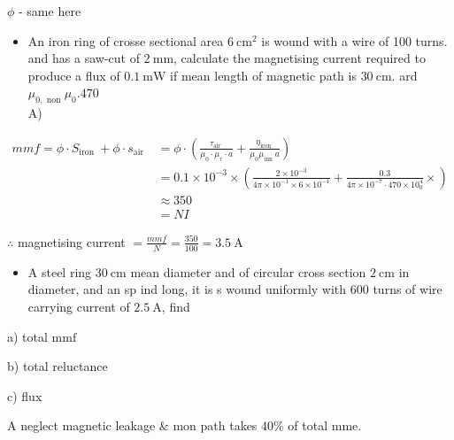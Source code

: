 \documentclass[12pt, a4paper]{article}
\begin{document}
$\phi$ - same here

\begin{itemize}
	\item An iron ring of crosse sectional area $6 \mathrm{~cm}^{2}$ is wound with a wire of 100 turns. and has a saw-cut of $2 \mathrm{~mm}$, calculate the magnetising current required to produce a flux of $0.1 \mathrm{~mW}$ if mean length of magnetic path is $30 \mathrm{~cm}$. ard $\mu_{0, \text { non }} \mu_{0} .470$\\
	      A)
\end{itemize}

$$
	\begin{aligned}
		m m f=\phi \cdot S_{\text {iron }}+\phi \cdot s_{\text {air }} & =\phi \cdot\left(\frac{\tau_{\text {air }}}{\mu_{0} \cdot \mu_{r} \cdot a}+\frac{\eta_{\text {iron }}}{\mu_{0} \mu_{\text {inn }} a}\right)                                      \\
		                                                               & =0.1 \times 10^{-3} \times\left(\frac{2 \times 10^{-3}}{4 \pi \times 10^{-1} \times 6 \times 10^{-4}}+\frac{0.3}{4 \pi \times 10^{-7} \cdot 470 \times 10_{0}^{4}} \times\right) \\
		                                                               & \approx 350                                                                                                                                                                      \\
		                                                               & =N I
	\end{aligned}
$$

$\therefore$ magnetising current $=\frac{m m f}{N}=\frac{350}{100}=3.5 \mathrm{~A}$

\begin{itemize}
	\item A steel ring $30 \mathrm{~cm}$ mean diameter and of circular cross section $2 \mathrm{~cm}$ in diameter, and an sp ind long, it is s wound uniformly with 600 turns of wire carrying current of $2.5 \mathrm{~A}$, find
\end{itemize}

a) total $\mathrm{mmf}$

b) total reluctance

c) flux

A neglect magnetic leakage \& mon path takes $40 \%$ of total mme.
\end{document}
